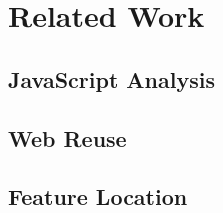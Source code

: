 
\section{Related Work}
\subsection{JavaScript Analysis}
\subsection{Web Reuse}
\subsection{Feature Location}